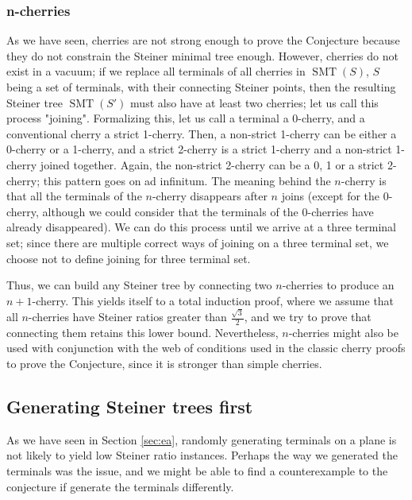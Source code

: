 \documentclass{mpaper}
\begin{document}
\subsubsection{n-cherries}
As we have seen, cherries are not strong enough to prove the Conjecture because they do not constrain the Steiner minimal tree enough. However, cherries do not exist in a vacuum; if we replace all terminals of all cherries in $\operatorname{SMT}(S)$, $S$ being a set of terminals, with their connecting Steiner points, then the resulting Steiner tree $\operatorname{SMT}(S')$ must also have at least two cherries; let us call this process "joining". Formalizing this, let us call a terminal a 0-cherry, and a conventional cherry a strict 1-cherry. Then, a non-strict 1-cherry can be either a 0-cherry or a 1-cherry, and a strict 2-cherry is a strict 1-cherry and a non-strict 1-cherry joined together. Again, the non-strict 2-cherry can be a 0, 1 or a strict 2-cherry; this pattern goes on ad infinitum. The meaning behind the $n$-cherry is that all the terminals of the $n$-cherry disappears after $n$ joins (except for the 0-cherry, although we could consider that the terminals of the 0-cherries have already disappeared). We can do this process until we arrive at a three terminal set; since there are multiple correct ways of joining on a three terminal set, we choose not to define joining for three terminal set.

Thus, we can build any Steiner tree by connecting two $n$-cherries to produce an $n+1$-cherry. This yields itself to a total induction proof, where we assume that all $n$-cherries have Steiner ratios greater than $\frac{\sqrt{3}}{2}$, and we try to prove that connecting them retains this lower bound. Nevertheless, $n$-cherries might also be used with conjunction with the web of conditions used in the classic cherry proofs to prove the Conjecture, since it is stronger than simple  cherries.

\subsection{Generating Steiner trees first}
As we have seen in Section \ref{sec:ea}, randomly generating terminals on a plane is not likely to yield low Steiner ratio instances. Perhaps the way we generated the terminals was the issue, and we might be able to find a counterexample to the conjecture if generate the terminals differently.
\end{document}

